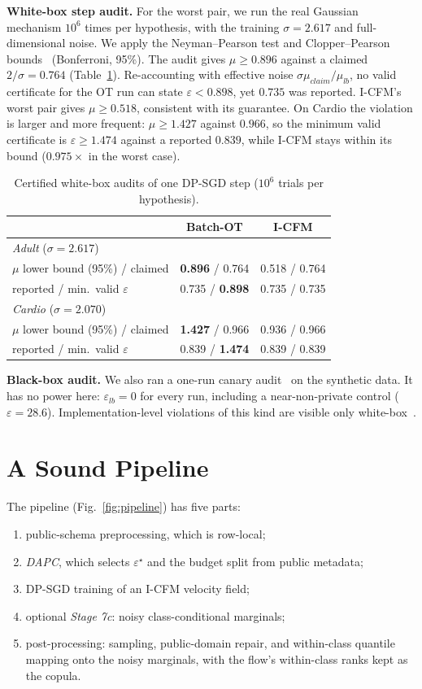 \documentclass[journal]{IEEEtran}
\newcommand{\eps}{\varepsilon}
\begin{document}
\textbf{White-box step audit.} For the worst pair, we run the real Gaussian mechanism $10^6$ times per hypothesis, with the training $\sigma=2.617$ and full-dimensional noise. We apply the Neyman--Pearson test and Clopper--Pearson bounds~\cite{clopper1934} (Bonferroni, 95\%). The audit gives $\mu\ge0.896$ against a claimed $2/\sigma=0.764$ (Table~\ref{tab:audit}). Re-accounting with effective noise $\sigma\mu_{claim}/\mu_{lb}$, no valid certificate for the OT run can state $\eps<0.898$, yet $0.735$ was reported. I-CFM's worst pair gives $\mu\ge0.518$, consistent with its guarantee. On Cardio the violation is larger and more frequent: $\mu\ge1.427$ against $0.966$, so the minimum valid certificate is $\eps\ge1.474$ against a reported $0.839$, while I-CFM stays within its bound ($0.975\times$ in the worst case).

\begin{table}[t]\centering\caption{Certified white-box audits of one DP-SGD step ($10^6$ trials per hypothesis).}\label{tab:audit}
\begin{tabular}{lcc}\toprule
 & Batch-OT & I-CFM\\\midrule
\multicolumn{3}{l}{\emph{Adult} ($\sigma=2.617$)}\\
$\mu$ lower bound (95\%) / claimed & \textbf{0.896} / 0.764 & 0.518 / 0.764\\
reported / min.\ valid $\eps$ & 0.735 / \textbf{0.898} & 0.735 / 0.735\\
\multicolumn{3}{l}{\emph{Cardio} ($\sigma=2.070$)}\\
$\mu$ lower bound (95\%) / claimed & \textbf{1.427} / 0.966 & 0.936 / 0.966\\
reported / min.\ valid $\eps$ & 0.839 / \textbf{1.474} & 0.839 / 0.839\\\bottomrule
\end{tabular}\end{table}

\textbf{Black-box audit.} We also ran a one-run canary audit~\cite{steinke2023one} on the synthetic data. It has no power here: $\eps_{lb}=0$ for every run, including a near-non-private control ($\eps=28.6$). Implementation-level violations of this kind are visible only white-box~\cite{tramer2022debugging}.

\section{A Sound Pipeline}\label{sec:pipeline}
The pipeline (Fig.~\ref{fig:pipeline}) has five parts:
\begin{enumerate}
\item public-schema preprocessing, which is row-local;
\item \emph{DAPC}, which selects $\eps^\star$ and the budget split from public metadata;
\item DP-SGD training of an I-CFM velocity field;
\item optional \emph{Stage 7c}: noisy class-conditional marginals;
\item post-processing: sampling, public-domain repair, and within-class quantile mapping onto the noisy marginals, with the flow's within-class ranks kept as the copula.
\end{enumerate}
\end{document}

